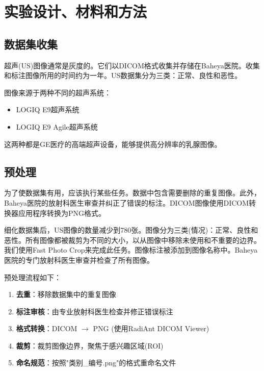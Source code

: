 \documentclass[supercite]{../Hust-undergraduate-translation/Experimental_Report}
\theoremstyle{definition}
\begin{document}
\section{实验设计、材料和方法}

\subsection{数据集收集}

超声(US)图像通常是灰度的。它们以DICOM格式收集并存储在Baheya医院。收集和标注图像所用的时间约为一年。US数据集分为三类：正常、良性和恶性。

图像来源于两种不同的超声系统：
\begin{itemize}
\item LOGIQ E9超声系统
\item LOGIQ E9 Agile超声系统
\end{itemize}

这两种都是GE医疗的高端超声设备，能够提供高分辨率的乳腺图像。

\subsection{预处理}

为了使数据集有用，应该执行某些任务。数据中包含需要删除的重复图像。此外，Baheya医院的放射科医生审查并纠正了错误的标注。DICOM图像使用DICOM转换器应用程序转换为PNG格式。

细化数据集后，US图像的数量减少到780张。图像分为三类(情况)：正常、良性和恶性。所有图像都被裁剪为不同的大小，以从图像中移除未使用和不重要的边界。我们使用Fast Photo Crop来完成此任务。图像标注被添加到图像名称中。Baheya医院的专门放射科医生审查并检查了所有图像。

预处理流程如下：

\begin{enumerate}
\item \textbf{去重}：移除数据集中的重复图像

\item \textbf{标注审核}：由专业放射科医生检查并修正错误标注

\item \textbf{格式转换}：DICOM $\rightarrow$ PNG (使用RadiAnt DICOM Viewer)

\item \textbf{裁剪}：裁剪图像边界，聚焦于感兴趣区域(ROI)

\item \textbf{命名规范}：按照"类别\_编号.png"的格式重命名文件
\end{enumerate}
\end{document}
